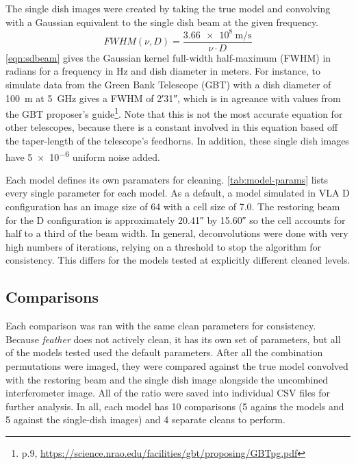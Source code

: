 \documentclass[manuscript,linenumbers]{aastex62}
\begin{document}
The single dish images were created by taking the true model and convolving with a Gaussian equivalent to the single dish beam at the given frequency. 
\begin{equation}
    FWHM(\nu, D) = \frac{\SI{3.66e8}{\meter\per\second}}{\nu \cdot D}
    \label{eqn:sdbeam}
\end{equation}
\autoref{eqn:sdbeam} gives the Gaussian kernel full-width half-maximum (FWHM) in radians for a frequency in Hz and dish diameter in meters. For instance, to simulate data from the Green Bank Telescope (GBT) with a dish diameter of \SI{100}{\meter} at \SI{5}{\giga\hertz} gives a FWHM of \ang{;2;31}, which is in agreance with values from the GBT proposer's guide\footnote{p.9, \url{https://science.nrao.edu/facilities/gbt/proposing/GBTpg.pdf}}. Note that this is not the most accurate equation for other telescopes, because there is a constant involved in this equation based off the taper-length of the telescope's feedhorns. In addition, these single dish images have \num{5e-6} uniform noise added. 

Each model defines its own paramaters for cleaning. \autoref{tab:model-params} lists every single parameter for each model. As a default, a model simulated in VLA D configuration has an image size of \num{64} with a cell size of \SI{7.0}{\arcsec}. The restoring beam for the D configuration is approximately \ang{;;20.41} by \ang{;;15.60} so the cell accounts for half to a third of the beam width. In general, deconvolutions were done with very high numbers of iterations, relying on a threshold to stop the algorithm for consistency. This differs for the models tested at explicitly different cleaned levels.



\subsection{Comparisons}
Each comparison was ran with the same clean parameters for consistency. Because \textit{feather} does not actively clean, it has its own set of parameters, but all of the models tested used the default parameters. After all the combination permutations were imaged, they were compared against the true model convolved with the restoring beam and the single dish image alongside the uncombined interferometer image. All of the ratio were saved into individual CSV files for further analysis. In all, each model has 10 comparisons (5 agains the models and 5 against the single-dish images) and 4 separate cleans to perform. 
\end{document}
